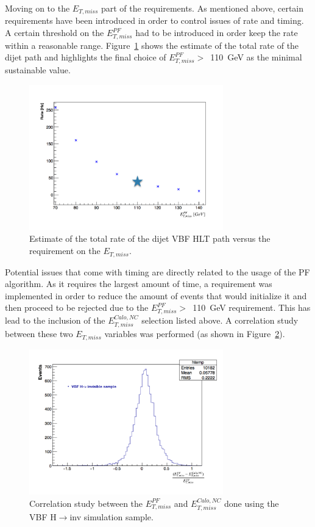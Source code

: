 \hspace{10pt} Moving on to the $E_{T,miss}$ part of the requirements. As mentioned above, certain requirements have been introduced in order to control issues of rate and timing. A certain threshold on the $E^{PF}_{T,miss}$ had to be introduced in order keep the rate within a reasonable range. Figure~\ref{fig:PFMETvsRate} shows the estimate of the total rate of the dijet path and highlights the final choice of $E^{PF}_{T,miss}>$~110~GeV as the minimal sustainable value.
\begin{figure}[!htbp]
  \centering
    \includegraphics[width=0.75\textwidth]{CMS_experiment/PFMETvsRate.pdf}
  \caption{Estimate of the total rate of the dijet VBF HLT path versus the requirement on the $E_{T,miss}$.}
  \label{fig:PFMETvsRate}
\end{figure}
Potential issues that come with timing are directly related to the usage of the PF algorithm. As it requires the largest amount of time, a requirement was implemented in order to reduce the amount of events that would initialize it and then proceed to be rejected due to the $E^{PF}_{T,miss}>$~110~GeV requirement. This has lead to the inclusion of the $E^{Calo, NC}_{T,miss}$ selection listed above. A correlation study between these two $E_{T,miss}$ variables was performed (as shown in Figure~\ref{fig:VBF_rates_timing}). 
\begin{figure}[!htbp]
  \centering
    \includegraphics[width=0.75\textwidth]{CMS_experiment/PFvsCaloMET.pdf}
  \caption{Correlation study between the $E^{PF}_{T,miss}$ and $E^{Calo,NC}_{T,miss}$ done using the VBF H$\rightarrow$inv simulation sample.}
  \label{fig:VBF_rates_timing}
\end{figure}
